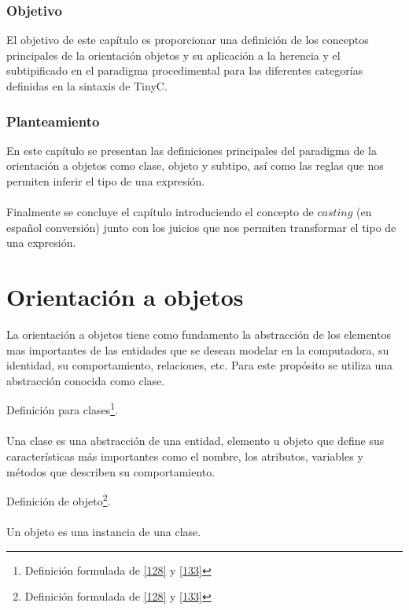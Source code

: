 \subsubsection{Objetivo}
El objetivo de este capítulo es proporcionar una definición de los conceptos principales de la orientación objetos y su aplicación a la herencia y el subtipificado en el paradigma procedimental para las diferentes categorías definidas en la sintaxis de \textsf{TinyC}.

\subsubsection{Planteamiento}
En este capítulo se presentan las definiciones principales del paradigma de la orientación a objetos como clase, objeto y subtipo, así como las reglas que nos permiten inferir el tipo de una expresión.\\\\
Finalmente se concluye el capítulo introduciendo el concepto de $casting$ (en español conversión) junto con los juicios que nos permiten transformar el tipo de una expresión. 

\section{Orientación a objetos}
La orientación a objetos tiene como fundamento la abstracción de los elementos mas importantes de las entidades que se desean modelar en la computadora, su identidad, su comportamiento, relaciones, etc. Para este propósito se utiliza una abstracción conocida como clase. 

\begin{definition}Definición para clases\footnote{Definición formulada de \hyperlink{128}{[128]} y \hyperlink{133}{[133]} }. \\\\
    Una clase es una abstracción de una entidad, elemento u objeto que define sus características más importantes como el nombre, los atributos, variables y métodos que describen su comportamiento.
\end{definition}

\bigskip

\begin{definition}Definición de objeto\footnote{Definición formulada de \hyperlink{128}{[128]} y \hyperlink{133}{[133]} }. \\\\
    Un objeto es una instancia de una clase.
\end{definition}

